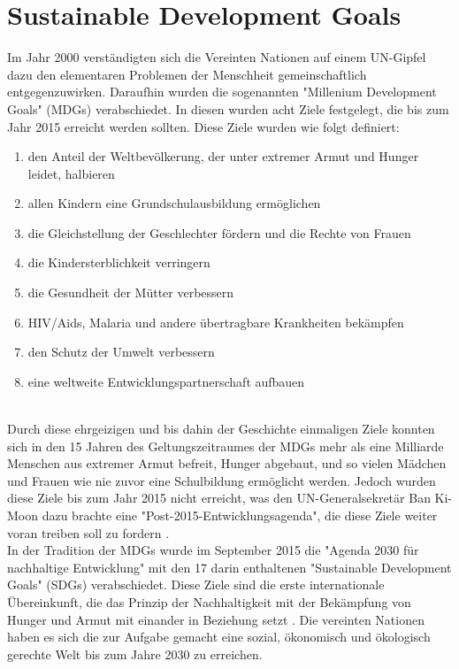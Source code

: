 \documentclass[letterpaper]{article}
\begin{document}
\clearpage

\section{Sustainable Development Goals}
Im Jahr 2000 verständigten sich die Vereinten Nationen auf einem UN-Gipfel dazu den elementaren Problemen der Menschheit gemeinschaftlich entgegenzuwirken. Daraufhin wurden die sogenannten "Millenium Development Goals" (MDGs) verabschiedet. In diesen wurden acht Ziele festgelegt, die bis zum Jahr 2015 erreicht werden sollten. Diese Ziele wurden wie folgt definiert: \cite{BMZ}

\begin{enumerate}
    \item den Anteil der Weltbevölkerung, der unter extremer Armut und Hunger leidet, halbieren
    \item allen Kindern eine Grundschulausbildung ermöglichen
    \item die Gleichstellung der Geschlechter fördern und die Rechte von Frauen 
    \item die Kindersterblichkeit verringern
    \item die Gesundheit der Mütter verbessern
    \item HIV/Aids, Malaria und andere übertragbare Krankheiten bekämpfen
    \item den Schutz der Umwelt verbessern
    \item eine weltweite Entwicklungspartnerschaft aufbauen
\end{enumerate}\\
Durch diese ehrgeizigen und bis dahin der Geschichte einmaligen Ziele konnten sich in den 15 Jahren des Geltungszeitraumes der MDGs mehr als eine Milliarde Menschen aus extremer Armut befreit, Hunger abgebaut, und so vielen Mädchen und Frauen wie nie zuvor eine Schulbildung ermöglicht werden. Jedoch wurden diese Ziele bis zum Jahr 2015 nicht erreicht, was den UN-Generalsekretär Ban Ki-Moon dazu brachte eine "Post-2015-Entwicklungsagenda", die diese Ziele weiter voran treiben soll zu fordern \cite{UN}.\\
In der Tradition der MDGs wurde im September 2015 die "Agenda 2030 für nachhaltige Entwicklung" mit den 17 darin enthaltenen "Sustainable Development Goals" (SDGs) verabschiedet. Diese Ziele sind die erste internationale Übereinkunft, die das Prinzip der Nachhaltigkeit mit der Bekämpfung von Hunger und Armut mit einander in Beziehung setzt \cite{BMZ}. Die vereinten Nationen haben es sich die zur Aufgabe gemacht eine sozial, ökonomisch und ökologisch gerechte Welt bis zum Jahre 2030 zu erreichen.\\
\end{document}
